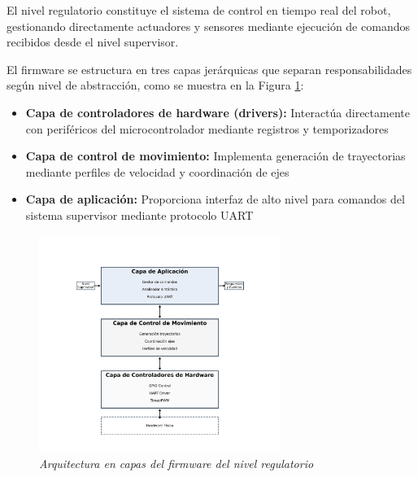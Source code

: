 El nivel regulatorio constituye el sistema de control en tiempo real del robot, gestionando directamente actuadores y sensores mediante ejecución de comandos recibidos desde el nivel supervisor.

El firmware se estructura en tres capas jerárquicas que separan responsabilidades según nivel de abstracción, como se muestra en la Figura \ref{fig:arquitectura_regulatorio}:

\begin{itemize}[label=$\bullet$]
\item \textbf{Capa de controladores de hardware (drivers):} Interactúa directamente con periféricos del microcontrolador mediante registros y temporizadores
\item \textbf{Capa de control de movimiento:} Implementa generación de trayectorias mediante perfiles de velocidad y coordinación de ejes
\item \textbf{Capa de aplicación:} Proporciona interfaz de alto nivel para comandos del sistema supervisor mediante protocolo UART
\end{itemize}

\begin{figure}[H]
    \centering
    \includegraphics[width=0.7\textwidth]{imagenes/arquitectura_regulatorio_capas.png}
    \caption{\textit{Arquitectura en capas del firmware del nivel regulatorio}}
    \label{fig:arquitectura_regulatorio}
\end{figure}
